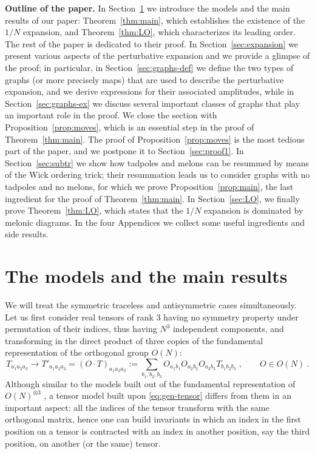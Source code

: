 \documentclass[10pt]{article}
\theoremstyle{plain}
\theoremstyle{definition}
\newcommand{\be}{\begin{equation}}
\newcommand{\ee}{\end{equation}}
\begin{document}
{\bf Outline of the paper.}
In Section~\ref{sec:models} we introduce the models and the main results of our paper: Theorem~\ref{thm:main}, which establishes the existence of the $1/N$ expansion, and Theorem~\ref{thm:LO}, which characterizes its leading order. The rest of the paper is dedicated to their proof. In Section~\ref{sec:expansion} we present various aspects of the perturbative expansion and we provide a glimpse of the proof; in particular, in Section~\ref{sec:graphs-def} we define the two types of graphs (or more precisely maps) that are used to describe the perturbative expansion, and we derive expressions for their associated amplitudes, while  in Section~\ref{sec:graphs-ex} we discuss several important classes of graphs that play an important role in the proof. We close the section with Proposition~\ref{prop:moves}, which is an essential step in the proof of Theorem~\ref{thm:main}. The proof of Proposition~\ref{prop:moves} is the most tedious part of the paper, and we postpone it to Section~\ref{sec:proof1}. In Section~\ref{sec:subtr} we show how tadpoles and melons can be resummed by means of the Wick ordering trick; their resummation leads us to consider graphs with no tadpoles and no melons, for which we prove Proposition~\ref{prop:main}, the last ingredient for the proof of Theorem~\ref{thm:main}. In Section~\ref{sec:LO}, we finally prove Theorem~\ref{thm:LO}, which states that the $1/N$ expansion is dominated by melonic diagrams. In the four Appendices we collect some useful ingredients and side results.
 
 
 
 
\newpage

\section{The models and the main results}
\label{sec:models}

We will treat the symmetric traceless and  antisymmetric cases simultaneously. 
Let us first consider real tensors of rank $3$ having no symmetry property under permutation of their indices, thus having $N^3$ independent components, and
transforming in the direct product of three copies of the fundamental representation of the orthogonal group $O(N)$:
\be \label{eq:gen-tensor}
T_{a_1 a_2 a_3} \rightarrow T'_{a_1a_2 a_3} = (O \cdot T)_{a_1a_2 a_3} := \sum_{b_1,b_2,b_3} O_{a_1b_1} O_{a_2b_2} O_{a_3b_3} T_{b_1b_2b_3} \;,  \qquad O \in O(N)\;.
\ee
Although similar to the models built out of the fundamental representation of $O(N)^{\otimes 3}$ \cite{RTM,expansion1,critical,uncoloring,Carrozza:2015adg,Klebanov:2016xxf}, a tensor model built upon \eqref{eq:gen-tensor} differs from them in an important aspect:
all the indices of the tensor transform with the same orthogonal matrix, hence one can build invariants in which an index in the first position on a tensor is contracted with an index in another position, say the third position, on another (or the same) tensor.
\end{document}
